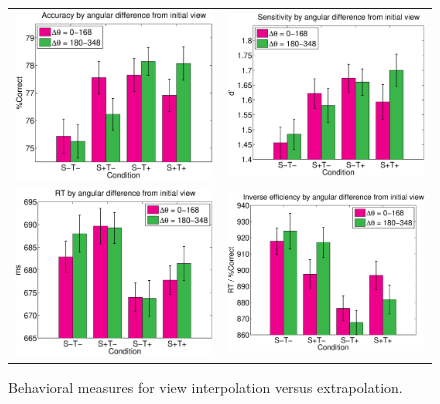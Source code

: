 \documentclass[dwyatte_dissertation.tex]{subfiles}
\begin{document}
\begin{figure}[h!]
\centering
\begin{tabular}{ll}
\includegraphics[width=80mm]{figs/pleast/results_accuracy_angle.eps} & 
\includegraphics[width=80mm]{figs/pleast/results_dprime_angle.eps} \\
\includegraphics[width=80mm]{figs/pleast/results_rt_angle.eps} & 
\includegraphics[width=80mm]{figs/pleast/results_ie_angle.eps} \\
\end{tabular}
\caption{Behavioral measures for view interpolation versus extrapolation.}{}
\label{fig:behave}
\end{figure}
\end{document}
